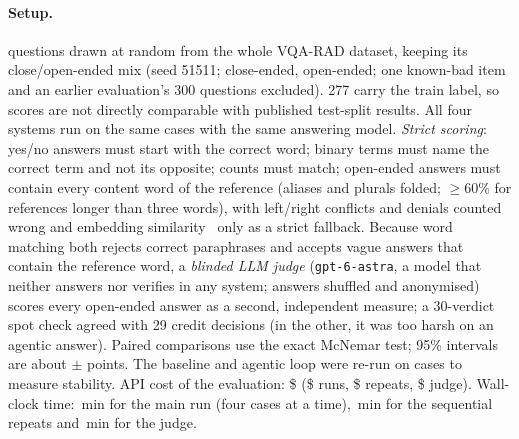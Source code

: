\documentclass{article}
\begin{document}
\paragraph{Setup.} \NCases{} questions drawn at random from the whole VQA-RAD dataset, keeping its close/open-ended
mix (seed 51511; \NClose{} close-ended, \NOpen{} open-ended; one known-bad item and an earlier evaluation's 300
questions excluded). 277 carry the train label, so scores are not directly comparable with published test-split
results. All four
systems run on the same cases with the same answering model. \emph{Strict scoring}: yes/no answers must start with
the correct word; binary terms must name the correct term and not its opposite; counts must match; open-ended answers
must contain every content word of the reference (aliases and plurals folded; $\geq$60\% for references longer than
three words), with left/right conflicts and denials counted wrong and embedding similarity~\cite{deka2022spubmed}
only as a strict fallback. Because word matching both rejects correct paraphrases and accepts vague answers that
contain the reference word, a \emph{blinded LLM judge} (\texttt{gpt-6-astra}, a model that neither answers nor
verifies in any system; answers shuffled and anonymised) scores every open-ended answer as a second, independent
measure; a 30-verdict spot check agreed with 29 credit decisions (in the other, it was too harsh on an agentic answer). Paired comparisons use the exact McNemar test; 95\% intervals are about
$\pm$\CIHalf{} points. The baseline and agentic loop were re-run on \VarCases{} cases to measure stability. API cost of the
evaluation: \$\CostTotal{} (\$\CostRun{} runs, \$\CostRepeats{} repeats, \$\CostJudge{} judge). Wall-clock time:
\MinEval\,min for the main run (four cases at a time), \MinRepeats\,min for the sequential repeats and
\MinJudge\,min for the judge.
\end{document}
